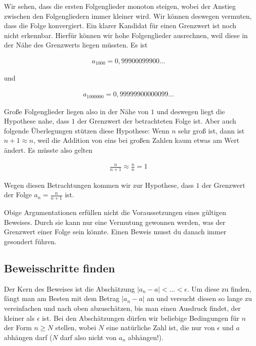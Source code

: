 \documentclass[fontsize=9pt,
               parskip=half-,
               DIV=14,
               listof=chapterentry,
               tocflat]{scrbook}
\begin{document}
Wir sehen, dass die ersten Folgenglieder monoton steigen, wobei der Anstieg zwischen den Folgengliedern immer kleiner wird. Wir können deswegen vermuten, dass die Folge konvergiert. Ein klarer Kandidat für einen Grenzwert ist noch nicht erkennbar. Hierfür können wir hohe Folgenglieder ausrechnen, weil diese in der Nähe des Grenzwerts liegen müssten. Es ist

\begin{align*}
a_{1000}=0,99900099900\ldots 
\end{align*}

und

\begin{align*}
a_{1000000}=0,99999900000099\ldots 
\end{align*}

Große Folgenglieder liegen also in der Nähe von $1$ und deswegen liegt die Hypothese nahe, dass $1$ der Grenzwert der betrachteten Folge ist. Aber auch folgende Überlegungen stützen diese Hypothese: Wenn $n$ sehr groß ist, dann ist $n+1\approx n$, weil die Addition von eins bei großen Zahlen kaum etwas am Wert ändert. Es müsste also gelten

\begin{align*}
{\tfrac {n}{n+1}}\approx {\tfrac {n}{n}}=1
\end{align*}

Wegen diesen Betrachtungen kommen wir zur Hypothese, dass $1$ der Grenzwert der Folge $a_{n}={\tfrac {n}{n+1}}$ ist.

\begin{warning*}
Obige Argumentationen erfüllen nicht die Voraussetzungen eines gültigen Beweises. Durch sie kann nur eine Vermutung gewonnen werden, was der Grenzwert einer Folge sein könnte. Einen Beweis musst du danach immer gesondert führen.

\end{warning*}

\subsection{Beweisschritte finden}

Der Kern des Beweises ist die Abschätzung $|a_{n}-a|<\ldots <\epsilon $. Um diese zu finden, fängt man am Besten mit dem Betrag $|a_{n}-a|$ an und versucht diesen so lange zu vereinfachen und nach oben abzuschätzen, bis man einen Ausdruck findet, der kleiner als $\epsilon $ ist. Bei den Abschätzungen dürfen wir beliebige Bedingungen für $n$ der Form $n\geq N$ stellen, wobei $N$ eine natürliche Zahl ist, die nur von $\epsilon $ und $a$ abhängen darf ($N$ darf also nicht von $a_{n}$ abhängen!).
\end{document}
